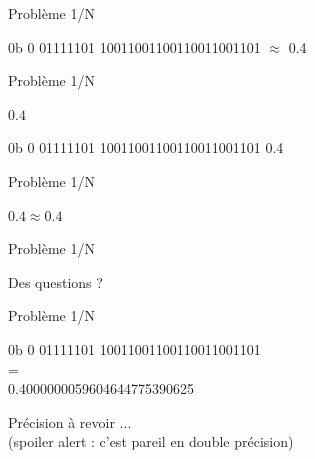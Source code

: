 \documentclass{beamer}
\begin{document}
  \begin{frame}{Problème 1/N} 
    \begin{center}
      \fontsize{100}{110}\selectfont{$0.4$}
    \end{center}
    \begin{center}
      0b \textcolor{SignColor}{0} \textcolor{ExponentColor}{01111101} \textcolor{FractionColor}{10011001100110011001101} $\approx$ 0.4
    \end{center}
  \end{frame}
  
  \begin{frame}{Problème 1/N} 
    \begin{center}
      \fontsize{100}{110}\selectfont $0.4$
    \end{center}
    \begin{center}
      0b \textcolor{SignColor}{0} \textcolor{ExponentColor}{01111101} \textcolor{FractionColor}{10011001100110011001101} \fontsize{40}{50}\selectfont{$\approx$} 0.4
    \end{center}
  \end{frame}
  
  \begin{frame}{Problème 1/N} 
    \begin{center}
      \fontsize{70}{80}\selectfont $0.4\approx0.4$
    \end{center}
  \end{frame}
  
  \begin{frame}{Problème 1/N} 
    \begin{center}
      \fontsize{50}{60}\selectfont Des questions ?
    \end{center}
  \end{frame}
  
  \begin{frame}{Problème 1/N} 
    \begin{center}
      \Large 0b \textcolor{SignColor}{0} \textcolor{ExponentColor}{01111101} \textcolor{FractionColor}{10011001100110011001101} \\
      = \\
      0.4000000059604644775390625
    \end{center}
    \begin{center}
    Précision à revoir ... \\
    (spoiler alert : c'est pareil en double précision)
    \end{center}
  \end{frame}
 
\end{document}
